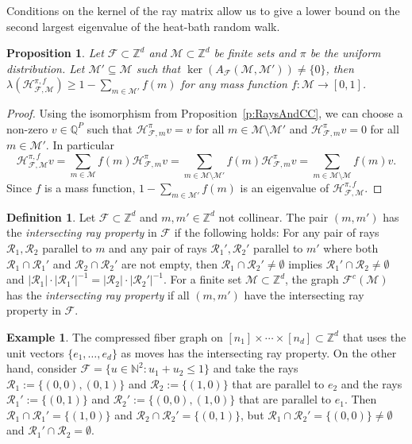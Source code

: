 \documentclass[11pt]{amsart}
\newtheorem{prop}[thm]{Proposition}
\theoremstyle{definition}
\newtheorem{example}[thm]{Example}
\newtheorem{defn}[thm]{Definition}
\numberwithin{equation}{section}
\newcommand{\ring}[1]{\ensuremath{\mathbb{#1}}}
\renewcommand{\>}{\rangle}
\newcommand{\<}{\langle}
\newcommand{\0}{\mathbf{0}}
\newcommand{\1}{\mathbf{1}}
\newcommand{\2}{\mathbf{2}}
\newcommand\NN{\ring{N}}
\newcommand\QQ{\ring{Q}}
\newcommand\ZZ{\ring{Z}}
\newcommand\cF{{\mathcal F}}
\newcommand\cM{{\mathcal M}}
\newcommand\cR{{\mathcal R}}
\newcommand{\rayMat}[3]{A_{#1}(#2,#3)}
\newcommand{\heatbath}[4]{\mathcal{H}^{#1,#2}_{#3,#4}}
\newcommand{\heatbathmove}[3]{\mathcal{H}^{#1}_{#2,#3}}
\begin{document}
Conditions on the kernel of the ray matrix allow us to give a lower bound on the 
second largest eigenvalue of the heat-bath random walk.

\begin{prop}\label{p:KernelRayMat}
Let $\cF\subset\ZZ^d$ and $\cM\subset\ZZ^d$ be finite sets and
$\pi$ be the uniform distribution.  Let
$\cM'\subseteq\cM$ such that $\ker(\rayMat{\cF}{\cM}{\cM'})\neq\{0\}$, then $\lambda(\heatbath{\pi}{f}{\cF}{\cM})\ge
1-\sum_{m\in\cM'}f(m)$ for any mass function $f:\cM\to[0,1]$.
\end{prop}
\begin{proof}
Using the isomorphism from Proposition~\ref{p:RaysAndCC}, we can
choose a non-zero $v\in\QQ^P$ such that
$\heatbathmove{\pi}{\cF}{m}v=v$ for all $m\in\cM\setminus\cM'$ and
$\heatbathmove{\pi}{\cF}{m}v=0$ for all $m\in\cM'$. In particular
\begin{equation*}
\heatbath{\pi}{f}{\cF}{\cM}v=\sum_{m\in\cM}f(m)\heatbathmove{\pi}{\cF}{m}v=
\sum_{m\in\cM\setminus\cM'}f(m)\heatbathmove{\pi}{\cF}{m}v=\sum_{m\in\cM\setminus\cM}f(m)v.
\end{equation*}
Since $f$ is a mass function, $1-\sum_{m\in\cM'}f(m)$ is an
eigenvalue of $\heatbath{\pi}{f}{\cF}{\cM}$.
\end{proof}

\begin{defn}\label{d:IntersectingRayProperty}
Let $\cF\subset\ZZ^d$ and $m,m'\in\ZZ^d$ not collinear. The pair
$(m,m')$ has the \emph{intersecting
ray property} in $\cF$ if the following holds:
For any pair of rays $\cR_1,\cR_2$ parallel to $m$ and any pair of rays
$\cR_1',\cR_2'$ parallel to $m'$ where both $\cR_1\cap\cR_1'$ and
$\cR_2\cap\cR_2'$ are not empty, then
$\cR_1\cap\cR_2'\neq\emptyset$ implies $\cR_1'\cap\cR_2\neq\emptyset$
and $|\cR_1|\cdot|\cR_1'|^{-1}=|\cR_2|\cdot|\cR_2'|^{-1}$. For a
finite set $\cM\subset\ZZ^d$, the graph $\cF^c(\cM)$ has the
\emph{intersecting ray property} if all $(m,m')$ have the intersecting
ray property in $\cF$.
\end{defn}

\begin{example}
The compressed fiber graph on
$[n_1]\times\cdots\times[n_d]\subset\ZZ^d$ that uses the unit vectors
$\{e_1,\dots,e_d\}$ as moves has the intersecting ray property. On the
other hand, consider $\cF=\{u\in\NN^2: u_1+u_2\le 1\}$ and take the
rays $\cR_1:=\{(0,0),(0,1)\}$ and $\cR_2:=\{(1,0)\}$ that
are parallel to $e_2$ and the rays $\cR_1':=\{(0,1)\}$ and
$\cR_2':=\{(0,0),(1,0)\}$ that are parallel to $e_1$. Then
$\cR_1\cap\cR_1'=\{(1,0)\}$ and $\cR_2\cap\cR_2'=\{(0,1)\}$, but
$\cR_1\cap\cR_2'=\{(0,0)\}\neq\emptyset$ and
$\cR_1'\cap\cR_2=\emptyset$.
\end{example}
\end{document}
